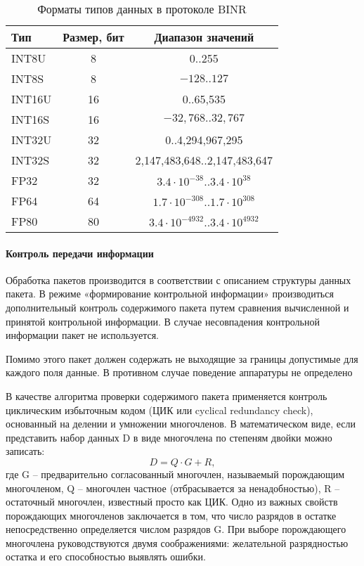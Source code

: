 \begin{longtable}[c]{|p{2cm}|c|c|}
	\caption{Форматы типов данных в протоколе BINR} \label{tab:formatbinr}\\
	\hline
	Тип & Размер, бит & Диапазон значений \\
	\hline
	INT8U & 8 & 0..255 \\
	
	INT8S & 8 & $-128..127$ \\
	
	INT16U & 16 & 0..65,535 \\
	
	INT16S & 16 & $-32,768..32,767$ \\
	
	INT32U & 32 & 0..4,294,967,295 \\
	INT32S & 32 & 2,147,483,648..2,147,483,647 \\
	FP32 & 32 & $3.4\cdot10^{-38}..3.4\cdot10^{38}$ \\
	FP64 & 64 & $1.7\cdot10^{-308}..1.7\cdot10^{308}$ \\
	FP80 & 80 & $3.4\cdot10^{-4932}..3.4\cdot10^{4932}$ \\
	\hline
\end{longtable}

\paragraph{Контроль передачи информации}

Обработка пакетов производится в соответствии с описанием структуры данных
пакета. В режиме «формирование контрольной информации» производиться
дополнительный контроль содержимого пакета путем сравнения вычисленной и принятой
контрольной информации. В случае несовпадения контрольной информации пакет не
используется.

Помимо этого пакет должен содержать не выходящие за границы допустимые для
каждого поля данные. В противном случае поведение аппаратуры не определено

В качестве алгоритма проверки содержимого пакета применяется контроль
циклическим избыточным кодом (ЦИК или cyclical redundancy check), основанный на
делении и умножении многочленов.
В математическом виде, если представить набор данных D в виде многочлена по
степеням двойки можно записать:
\begin{equation}
	D = Q \cdot G + R,
\end{equation}
где G -- предварительно согласованный многочлен, называемый порождающим
многочленом, Q -- многочлен частное (отбрасывается за ненадобностью), R -- остаточный
многочлен, известный просто как ЦИК. Одно из важных свойств порождающих
многочленов заключается в том, что число разрядов в остатке непосредственно
определяется числом разрядов G. При выборе порождающего многочлена
руководствуются двумя соображениями: желательной разрядностью остатка и его
способностью выявлять ошибки.

